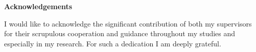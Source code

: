\thispagestyle{plain}

\mbox{}
\vfill

\large
\textbf{Acknowledgements}
\vspace*{1cm}

\normalsize
I would like to acknowledge the significant contribution of both my supervisors for their scrupulous cooperation and guidance throughout my studies and especially in my research. For such a dedication I am deeply grateful.